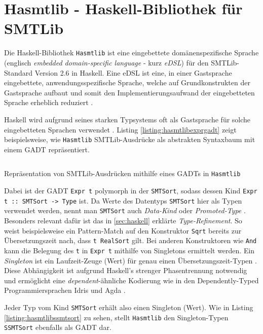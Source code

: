 \section{Hasmtlib - Haskell-Bibliothek für SMTLib}
\label{sec:hasmtlib}
Die Haskell-Bibliothek \texttt{Hasmtlib} \cite{hasmtlib} ist eine eingebettete domänenspezifische Sprache
(englisch \textit{embedded domain-specific language} - kurz \textit{eDSL}) für den SMTLib-Standard Version 2.6 \cite{smtlib} in Haskell.
Eine eDSL ist eine, in einer Gastsprache eingebettete, anwendungsspezifische Sprache, welche auf Grundkonstrukten der Gastsprache aufbaut und somit den
Implementierungsaufwand der eingebetteten Sprache erheblich reduziert \cite{eDSL}.

Haskell wird aufgrund seines starken Typsystems oft als Gastsprache für solche eingebetteten Sprachen verwendet \cite{eDSL2}.
Listing \ref{listing:hasmtlibexprgadt} zeigt beispielsweise, wie \texttt{Hasmtlib} SMTLib-Ausdrücke als abstrakten Syntaxbaum mit einem GADT repräsentiert.

\begin{listing}[H]
    \inputminted[linenos=true]{haskell}{Code/Implementierung/Hasmtlib/ExprGADT.hs}
    \caption{Repräsentation von SMTLib-Ausdrücken mithilfe eines GADTs in \texttt{Hasmtlib} \cite{hasmtlibExpr}}
    \label{listing:hasmtlibexprgadt}
\end{listing}

Dabei ist der GADT \texttt{Expr t} polymorph in der \texttt{SMTSort}, sodass dessen Kind \texttt{Expr t :: SMTSort -> Type} ist.
Da Werte des Datentyps \texttt{SMTSort} hier als Typen verwendet werden, nennt man \texttt{SMTSort} auch \textit{Data-Kind} oder \textit{Promoted-Type} \cite{singletons}.
Besonders relevant dafür ist das in \ref{sec:haskell} erklärte \textit{Type-Refinement}.
So weist beispielsweise ein Pattern-Match auf den Konstruktor \texttt{Sqrt} bereits zur Übersetzungszeit nach, dass \texttt{t \raisebox{-0.6ex}{\textasciitilde} RealSort} gilt.
Bei anderen Konstruktoren wie \texttt{And} kann die Belegung des \texttt{t} in \texttt{Expr t} mithilfe von Singletons ermittelt werden.
Ein \textit{Singleton} ist ein Laufzeit-Zeuge (Wert) für genau einen Übersetzungszeit-Typen \cite{singletons}.
Diese Abhängigkeit ist aufgrund Haskell's strenger Phasentrennung notwendig und ermöglicht eine \textit{dependent}-ähnliche Kodierung
wie in den Dependently-Typed Programmiersprachen Idris \cite{idris} und Agda \cite{agda}.

Jeder Typ vom Kind \texttt{SMTSort} erhält also einen Singleton (Wert).
Wie in Listing \ref{listing:hasmtlibssmtsort} zu sehen, stellt \texttt{Hasmtlib} den Singleton-Typen \texttt{SSMTSort} ebenfalls als GADT dar.

